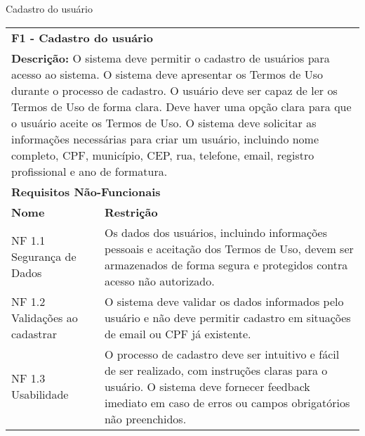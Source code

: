 \begin{tabframed}[htb]
  \caption{Cadastro do usuário}
  \label{quad:requisitoCadastroUsuario}
  \renewcommand{\arraystretch}{1.5}
  \begin{tabular}{|l|l|}
    \cline{1-2}
    \multicolumn{2}{|l|}{\textbf{F1 - Cadastro do usuário} }
    \\ \cline{1-2}

    \multicolumn{2}{|p{15cm}|}{
    \raggedright \textbf{Descrição:} O sistema deve permitir o cadastro de usuários para acesso ao sistema. O sistema deve apresentar os Termos de Uso durante o processo de cadastro. O usuário deve ser capaz de ler os Termos de Uso de forma clara. Deve haver uma opção clara para que o usuário aceite os Termos de Uso. O sistema deve solicitar as informações necessárias para criar um usuário, incluindo nome completo, CPF, município, CEP, rua, telefone, email, registro profissional e ano de formatura.
    }
    \\ \cline{1-2}

    \multicolumn{2}{|l|}{\textbf{Requisitos Não-Funcionais}}
    \\ \cline{1-2}

    \textbf{Nome}                  &
    \textbf{Restrição}
    \\ \cline{1-2}

    NF 1.1 Segurança de Dados      &
    \multicolumn{1}{|p{8cm}|}{\raggedright Os dados dos usuários, incluindo informações pessoais e aceitação dos Termos de Uso, devem ser armazenados de forma segura e protegidos contra acesso não autorizado.}
    \\ \cline{1-2}

    NF 1.2 Validações ao cadastrar &
    \multicolumn{1}{|p{8cm}|}{\raggedright O sistema deve validar os dados informados pelo usuário e não deve permitir cadastro em situações de email ou CPF já existente.}
    \\ \cline{1-2}

    NF 1.3 Usabilidade             &
    \multicolumn{1}{|p{8cm}|}{\raggedright O processo de cadastro deve ser intuitivo e fácil de ser realizado, com instruções claras para o usuário. O sistema deve fornecer feedback imediato em caso de erros ou campos obrigatórios não preenchidos.}
    \\ \cline{1-2}
  \end{tabular}
  \fonte{} %
\end{tabframed}

\clearpage

